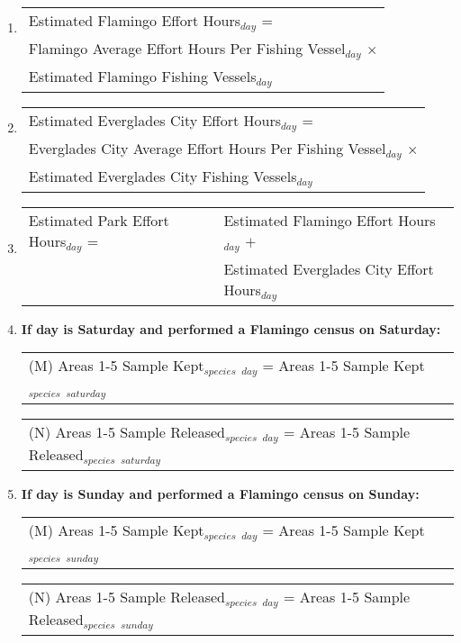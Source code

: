 \documentclass[letterpaper,12pt]{article}
\newcommand{\hspacer}{\hspace*{1cm}}
\begin{document}
\begin{enumerate}
\item
\begin{tabular}{l@{ }}
Estimated Flamingo Effort Hours$_{day}$ = \\
\hspacer Flamingo Average Effort Hours Per Fishing Vessel$_{day}$ $\times$ \\
\hspacer Estimated Flamingo Fishing Vessels$_{day}$ \\
\end{tabular}

\item
\begin{tabular}{l@{ }}
Estimated Everglades City Effort Hours$_{day}$ = \\
\hspacer Everglades City Average Effort Hours Per Fishing Vessel$_{day}$
		$\times$ \\
\hspacer Estimated Everglades City Fishing Vessels$_{day}$ \\
\end{tabular}

\item
\begin{tabular}{l@{ }l@{ }}
	Estimated Park Effort Hours$_{day}$ =
	& Estimated Flamingo Effort Hours$_{day}$ $+$ \\
	& Estimated Everglades City Effort Hours$_{day}$ \\
\end{tabular}

\item
\textbf{If day is Saturday and performed a Flamingo census on Saturday:} \\
\begin{tabular}{l@{ }}
	(M) Areas 1-5 Sample Kept$_{species}$ $_{day}$ =
		Areas 1-5 Sample Kept$_{species}$ $_{saturday}$
\end{tabular}

\begin{tabular}{l@{ }}
	(N) Areas 1-5 Sample Released$_{species}$ $_{day}$ =
		Areas 1-5 Sample Released$_{species}$ $_{saturday}$
\end{tabular}

\item
\textbf{If day is Sunday and performed a Flamingo census on Sunday:} \\
\begin{tabular}{l@{ }}
	(M) Areas 1-5 Sample Kept$_{species}$ $_{day}$ =
		Areas 1-5 Sample Kept$_{species}$ $_{sunday}$
\end{tabular}

\begin{tabular}{l@{ }}
	(N) Areas 1-5 Sample Released$_{species}$ $_{day}$ =
		Areas 1-5 Sample Released$_{species}$ $_{sunday}$
\end{tabular}


\end{enumerate}
\end{document}
